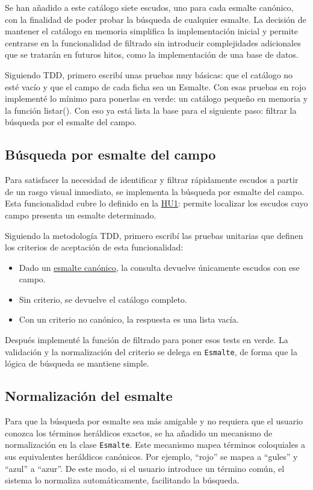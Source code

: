 Se han añadido a este catálogo siete escudos, uno para cada esmalte canónico, con la finalidad de
poder probar la búsqueda de cualquier esmalte. La decisión de mantener el catálogo en memoria
simplifica la implementación inicial y permite centrarse en la funcionalidad de filtrado sin
introducir complejidades adicionales que se tratarán en futuros hitos, como la implementación
de una base de datos.

Siguiendo TDD, primero escribí unas pruebas muy básicas: que el catálogo no esté vacío y que el 
campo de cada ficha sea un Esmalte. Con esas pruebas en rojo implementé lo mínimo para ponerlas en
verde: un catálogo pequeño en memoria y la función listar(). Con eso ya está lista la base para el
siguiente paso: filtrar la búsqueda por el esmalte del campo.

\subsection{Búsqueda por esmalte del campo}
Para satisfacer la necesidad de identificar y filtrar rápidamente escudos a partir de un rasgo visual
inmediato, se implementa la búsqueda por esmalte del campo. Esta funcionalidad cubre lo definido en la
\hyperref[sec:hu1]{HU1}: permite localizar los escudos cuyo campo presenta un esmalte determinado.

Siguiendo la metodología TDD, primero escribí las pruebas unitarias que definen los criterios de
aceptación de esta funcionalidad:

\begin{itemize}
    \item Dado un \hyperref[fig:esmaltes]{esmalte canónico}, la consulta devuelve únicamente escudos con ese campo.
    \item Sin criterio, se devuelve el catálogo completo.
    \item Con un criterio no canónico, la respuesta es una lista vacía.
\end{itemize}

Después implementé la función de filtrado para poner esos tests en verde. La validación y 
la normalización del criterio se delega en \texttt{Esmalte}, de forma que la lógica de
búsqueda se mantiene simple.

\subsection{Normalización del esmalte}
Para que la búsqueda por esmalte sea más amigable y no requiera que el usuario conozca los términos
heráldicos exactos, se ha añadido un mecanismo de normalización en la clase \texttt{Esmalte}. 
Este mecanismo mapea términos coloquiales a sus equivalentes heráldicos canónicos. Por ejemplo,
``rojo'' se mapea a ``gules'' y ``azul'' a ``azur''. De este modo, si el usuario introduce un término común,
el sistema lo normaliza automáticamente, facilitando la búsqueda.